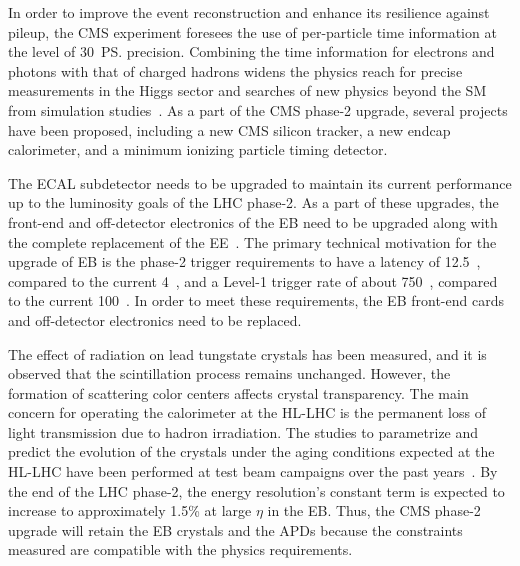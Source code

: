 In order to improve the event reconstruction and enhance its resilience against pileup, the CMS experiment foresees the use of per-particle time information at the level of 30~\ps precision. Combining the time information for electrons and photons with that of charged hadrons widens the physics reach for precise measurements in the Higgs sector and searches of new physics beyond the SM from simulation studies~\cite{Butler:2019rpu}. As a part of the CMS phase-2 upgrade, several projects have been proposed, including a new CMS silicon tracker, a new endcap calorimeter, and a minimum ionizing particle timing detector.

The ECAL subdetector needs to be upgraded to maintain its current performance up to the luminosity goals of the LHC phase-2. As a part of these upgrades, the front-end and off-detector electronics of the EB need to be upgraded along with the complete replacement of the EE~\cite{CMSCollaboration:2015zni}. The primary technical motivation for the upgrade of EB is the phase-2 trigger requirements to have a latency of 12.5~\mus, compared to the current 4~\mus, and a Level-1 trigger rate of about 750~\khz, compared to the current 100~\khz. In order to meet these requirements, the EB front-end cards and off-detector electronics need to be replaced.

The effect of radiation on lead tungstate crystals has been measured, and it is observed that the scintillation process remains unchanged. However, the formation of scattering color centers affects crystal transparency. The main concern for operating the calorimeter at the HL-LHC is the permanent loss of light transmission due to hadron irradiation. The studies to parametrize and predict the evolution of the crystals under the aging conditions expected at the HL-LHC have been performed at test beam campaigns over the past years~\cite{Adams:2016viv}. By the end of the LHC phase-2, the energy resolution's constant term is expected to increase to approximately 1.5\% at large $\eta$ in the EB. Thus, the CMS phase-2 upgrade will retain the EB crystals and the APDs because the constraints measured are compatible with the physics requirements.

